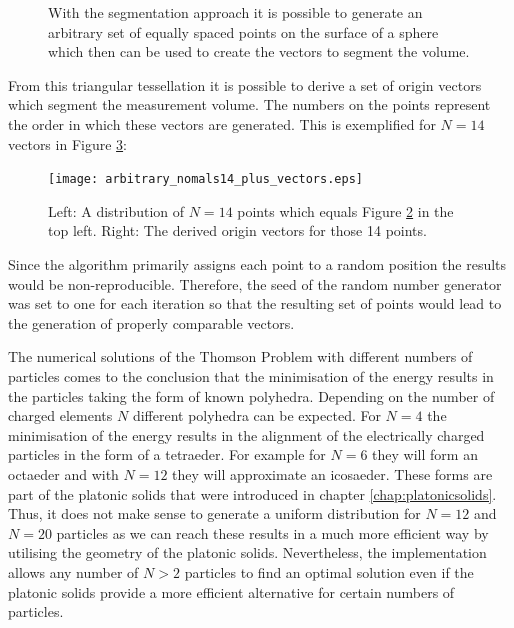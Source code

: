 \begin{figure}[H]
\begin{subfigure}[b]{0.48\textwidth}
         \label{fig:arbitary_n200}
     \end{subfigure} 
        \caption{With the segmentation approach it is possible to generate an arbitrary set of equally spaced points on the surface of a sphere which then can be used to create the vectors to segment the volume. }
        \label{fig:arbitrary_example}
\end{figure}

From this triangular tessellation it is possible to derive a set of origin vectors which segment the measurement volume. The numbers on the points represent the order in which these vectors are generated. This is exemplified for $N = 14$ vectors in Figure \ref{vectors_from_points}:

\begin{figure}[H]
    \texttt{[image: arbitrary\_nomals14\_plus\_vectors.eps]}
    \caption{Left: A distribution of $N = 14$ points which equals Figure \ref{fig:arbitrary_example} in the top left. Right: The derived origin vectors for those 14 points.}
    \label{vectors_from_points}
\end{figure}


Since the algorithm primarily assigns each point to a random position the results would be non-reproducible. Therefore, the seed of the random number generator was set to one for each iteration so that the resulting set of points would lead to the generation of properly comparable vectors. 

The numerical solutions of the Thomson Problem with different numbers of particles comes to the conclusion that the minimisation of the energy results in the particles taking the form of known polyhedra. Depending on the number of charged elements $N$ different polyhedra can be expected. For $N = 4$ the minimisation of the energy results in the alignment of the electrically charged particles in the form of a tetraeder. For example for $N = 6$ they will form an octaeder and with $N = 12$ they will approximate an icosaeder. These forms are part of the platonic solids that were introduced in chapter \ref{chap:platonicsolids}. Thus, it does not make sense to generate a uniform distribution for $N = 12$ and $N = 20$ particles as we can reach these results in a much more efficient way by utilising the geometry of the platonic solids. Nevertheless, the implementation allows any number of $N > 2$ particles to find an optimal solution even if the platonic solids provide a more efficient alternative for certain numbers of particles.


